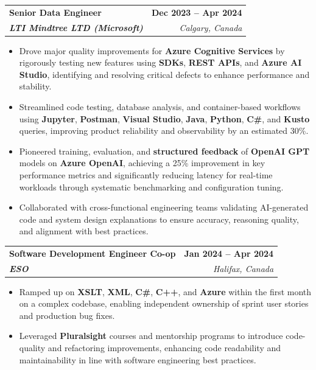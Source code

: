 \documentclass[letterpaper,11pt]{article}
\makeatletter
\newcommand{\resumeItem}[1]{
  \item\small{
    {#1 \vspace{-2pt}}
  }
}
\newcommand{\resumeSubheading}[4]{
  \vspace{-2pt}\item
    \begin{tabular*}{1.0\textwidth}[t]{l@{\extracolsep{\fill}}r}
      \textbf{#1} & \textbf{\small #2} \\
      \textit{\small#3} & \textit{\small #4} \\
    \end{tabular*}\vspace{-7pt}
}
\newcommand{\resumeItemListStart}{\begin{itemize}}
\newcommand{\resumeItemListEnd}{\end{itemize}\vspace{-5pt}}
\makeatother
\begin{document}
    \resumeSubheading
      {\textbf{Senior Data Engineer}}{\textbf{Dec 2023 -- Apr 2024}}
      {\textbf{LTI Mindtree LTD (Microsoft)}}{Calgary, Canada}
      \resumeItemListStart
        \resumeItem{Drove major quality improvements for \textbf{Azure Cognitive Services} by rigorously testing new features using \textbf{SDKs}, \textbf{REST APIs}, and \textbf{Azure AI Studio}, identifying and resolving critical defects to enhance performance and stability.}
        \resumeItem{Streamlined code testing, database analysis, and container-based workflows using \textbf{Jupyter}, \textbf{Postman}, \textbf{Visual Studio}, \textbf{Java}, \textbf{Python}, \textbf{C\#}, and \textbf{Kusto} queries, improving product reliability and observability by an estimated 30\%.}
        \resumeItem{Pioneered training, evaluation, and \textbf{structured feedback} of \textbf{OpenAI GPT} models on \textbf{Azure OpenAI}, achieving a 25\% improvement in key performance metrics and significantly reducing latency for real-time workloads through systematic benchmarking and configuration tuning.}
        \resumeItem{Collaborated with cross-functional engineering teams validating AI-generated code and system design explanations to ensure accuracy, reasoning quality, and alignment with best practices.}
      \resumeItemListEnd
    
    \resumeSubheading
      {\textbf{Software Development Engineer Co-op}}{\textbf{Jan 2024 -- Apr 2024}}
      {\textbf{ESO}}{Halifax, Canada}
      \resumeItemListStart
        \resumeItem{Ramped up on \textbf{XSLT}, \textbf{XML}, \textbf{C\#}, \textbf{C++}, and \textbf{Azure} within the first month on a complex codebase, enabling independent ownership of sprint user stories and production bug fixes.}
        \resumeItem{Leveraged \textbf{Pluralsight} courses and mentorship programs to introduce code-quality and refactoring improvements, enhancing code readability and maintainability in line with software engineering best practices.}
      \resumeItemListEnd
\end{document}
